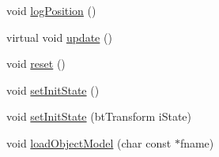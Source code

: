 \begin{DoxyCompactItemize}
\item 
void \hyperlink{classbtosgObject_acfd70fa6477c80fd7f29ad7ab9f4f067}{log\+Position} ()
\item 
virtual void \hyperlink{classbtosgObject_a342917817dfde62554f83da8e0d5110b}{update} ()
\item 
void \hyperlink{classbtosgObject_a93983f9180dd0672f8779cf2baa78580}{reset} ()
\item 
void \hyperlink{classbtosgObject_ad1508a0ce28cfac83e5f0ff6245f91b5}{set\+Init\+State} ()
\item 
void \hyperlink{classbtosgObject_a6ceb08e59ee95acaaef389ee198d2b56}{set\+Init\+State} (bt\+Transform i\+State)
\item 
void \hyperlink{classbtosgObject_a91838b8235579da178fcc06e6d3d47f3}{load\+Object\+Model} (char const $\ast$fname)
\end{DoxyCompactItemize}
